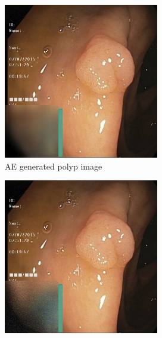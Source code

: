 \begin{figure}[h]
\begin{subfigure}[t]{\myfigsizethree}
            \includegraphics[width=\textwidth]{experiments/figures/greensquare/normalmissAE.png}
            \caption{AE generated polyp image }   
            \label{fig:polyp_AE_SQUARE2}
        \end{subfigure}
        \qquad
        \begin{subfigure}[t]{\myfigsizethree}  
            \centering 
            \includegraphics[width=\textwidth]{experiments/figures/greensquare/normalmissGAN.png}

\end{subfigure}
\end{figure}
